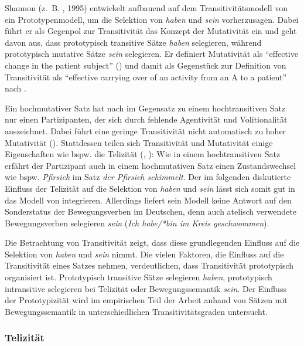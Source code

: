 Shannon (z.~B. \cite{Shannon.1992}, 1995) entwickelt aufbauend auf dem Transitivitätsmodell von \textcite{Hopper.1980} ein Prototypenmodell, um die Selektion von \textit{haben} und \textit{sein} vorherzusagen. Dabei führt er als Gegenpol zur Transitivität das Konzept der Mutativität ein und geht davon aus, dass prototypisch transitive Sätze \textit{haben} selegieren, während prototypisch mutative Sätze \textit{sein} selegieren. Er definiert  Mutativität als "`effective change in the patient
subject"' (\cite[133]{Shannon.1995}) und damit als Gegenstück zur Definition von Transitivität  als "`effective carrying over of an activity from an A to a patient"' nach \textcite[279]{Hopper.1980}.

 
Ein hochmutativer Satz hat nach \textcite[133]{Shannon.1995} im Gegensatz zu einem hochtransitiven Satz nur einen Partizipanten, der sich durch fehlende Agentivität und Volitionalität auszeichnet. Dabei führt eine geringe Transitivität nicht automatisch zu hoher Mutativität (\cite[133]{Shannon.1995}). Stattdessen teilen sich Transitivität und Mutativität einige Eigenschaften wie bspw. die Telizität (\cite[132--134]{Shannon.1995}, \cite[119--120]{Gillmann.2016}): Wie in einem hochtransitiven Satz erfährt der Partizipant auch in einem hochmutativen Satz einen Zustandswechsel wie bspw. \textit{Pfirsich} im Satz \textit{der Pfirsich schimmelt}. Der im folgenden  diskutierte Einfluss der Telizität auf die Selektion von \textit{haben} und \textit{sein} lässt sich somit gut in das Modell von \textcite{Shannon.1995} integrieren. Allerdings liefert sein Modell keine Antwort auf den Sonderstatus der Bewegungsverben im Deutschen, denn auch atelisch verwendete Bewegungsverben selegieren \textit{sein} (\textit{Ich habe/*bin im Kreis geschwommen}). 

Die Betrachtung von Transitivität zeigt, dass diese grundlegenden Einfluss auf die Selek\-tion von \textit{haben} und \textit{sein} nimmt. Die vielen Faktoren, die Einfluss auf die Transitivität eines Satzes nehmen, verdeutlichen, dass Transitivität prototypisch organisiert ist. Prototypisch transitive Sätze selegieren \textit{haben}, prototypisch intransitive selegieren bei Telizität oder Bewegungssemantik \textit{sein}. Der Einfluss der Prototypizität wird im empirischen Teil der Arbeit anhand von Sätzen mit Bewegungssemantik in unterschiedlichen Transitivitätsgraden untersucht.

\subsubsection{Telizität} 
\label{tele}

